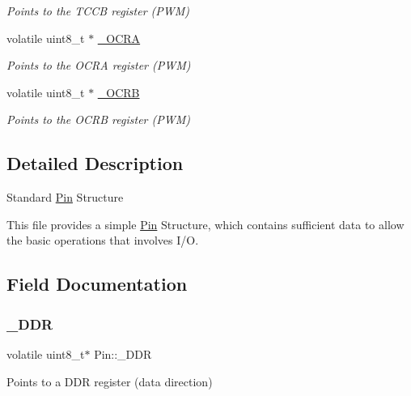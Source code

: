 \begin{DoxyCompactItemize}
\begin{DoxyCompactList}\small\item\em Points to the T\+C\+CB register (P\+WM) \end{DoxyCompactList}\item 
volatile uint8\+\_\+t $\ast$ \mbox{\hyperlink{structPin_a976f138d98dad2ae1ef47a9c4b1f66bb}{\+\_\+\+O\+C\+RA}}
\begin{DoxyCompactList}\small\item\em Points to the O\+C\+RA register (P\+WM) \end{DoxyCompactList}\item 
volatile uint8\+\_\+t $\ast$ \mbox{\hyperlink{structPin_ad99c326bebfcc9f780b9590aaeb04f68}{\+\_\+\+O\+C\+RB}}
\begin{DoxyCompactList}\small\item\em Points to the O\+C\+RB register (P\+WM) \end{DoxyCompactList}\end{DoxyCompactItemize}


\subsection{Detailed Description}
Standard \mbox{\hyperlink{structPin}{Pin}} Structure

This file provides a simple \mbox{\hyperlink{structPin}{Pin}} Structure, which contains sufficient data to allow the basic operations that involves I/O. 

\subsection{Field Documentation}
\mbox{\label{structPin_a47b066cff2835c1b135cad6677dad889}} 
\subsubsection{\texorpdfstring{\+\_\+\+D\+DR}{\_DDR}}
{\footnotesize\ttfamily volatile uint8\+\_\+t$\ast$ Pin\+::\+\_\+\+D\+DR}



Points to a D\+DR register (data direction) 

\mbox{\label{structPin_a976f138d98dad2ae1ef47a9c4b1f66bb}} 
